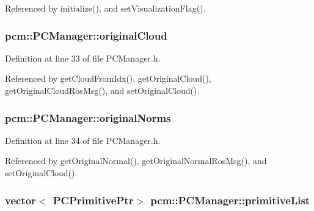 Referenced by initialize(), and set\-Visualization\-Flag().

\hypertarget{classpcm_1_1PCManager_a2f7fc5bdae476711dbd0b79fccca14f3}{
\subsubsection[{original\-Cloud}]{ pcm\-::\-P\-C\-Manager\-::original\-Cloud\hspace{0.3cm}{\ttfamily [private]}}}\label{classpcm_1_1PCManager_a2f7fc5bdae476711dbd0b79fccca14f3}


Definition at line 33 of file P\-C\-Manager.\-h.



Referenced by get\-Cloud\-From\-Idx(), get\-Original\-Cloud(), get\-Original\-Cloud\-Ros\-Msg(), and set\-Original\-Cloud().

\hypertarget{classpcm_1_1PCManager_a87eb9af97f2704d0bae90e27ef483462}{
\subsubsection[{original\-Norms}]{ pcm\-::\-P\-C\-Manager\-::original\-Norms\hspace{0.3cm}{\ttfamily [private]}}}\label{classpcm_1_1PCManager_a87eb9af97f2704d0bae90e27ef483462}


Definition at line 34 of file P\-C\-Manager.\-h.



Referenced by get\-Original\-Normal(), get\-Original\-Normal\-Ros\-Msg(), and set\-Original\-Cloud().

\hypertarget{classpcm_1_1PCManager_a0306662716691bbf53aaa55c768d582d}{
\subsubsection[{primitive\-List}]{\setlength{\rightskip}{0pt plus 5cm}vector$<$ {\bf P\-C\-Primitive\-Ptr}$>$ pcm\-::\-P\-C\-Manager\-::primitive\-List\hspace{0.3cm}{\ttfamily [private]}}}\label{classpcm_1_1PCManager_a0306662716691bbf53aaa55c768d582d}


